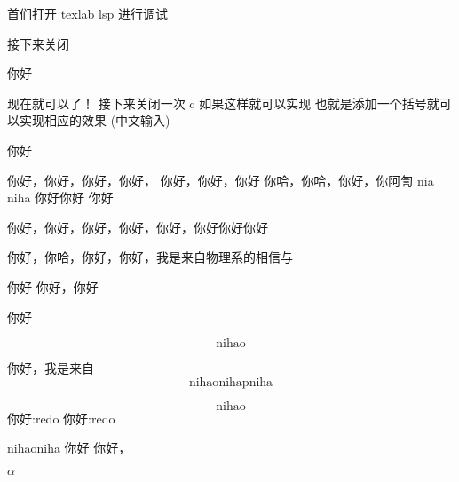 首们打开 texlab lsp 进行调试

接下来关闭

你好
\begin{figure}
\end{figure}

现在就可以了！
接下来关闭一次
c
如果这样就可以实现
 也就是添加一个括号就可以实现相应的效果 (中文输入)

你好


你好，你好，你好，你好，
你好，你好，你好
你哈，你哈，你好，你阿訇 nia
niha 你好你好 你好

你好，你好，你好，你好，你好，你好你好你好

你好，你哈，你好，你好，我是来自物理系的相信与

你好 你好，你好

你好

\begin{equation}
	\text{nihao}
\end{equation}

你好，我是来自
\begin{equation}
	\text{nihao}
	\text{nihap}
	\text{niha}
\end{equation}

\begin{equation}
	\text{nihao}
\end{equation}
你好:redo
你好:redo

nihaoniha
你好
你好，


$\alpha$

